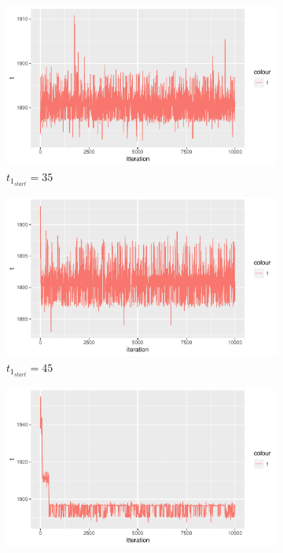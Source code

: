 \begin{figure}[h]
    \centering
    \begin{subfigure}[b]{0.32\textwidth}
        \centering
        \includegraphics[width = \textwidth]{Images/sim_t_start_35.pdf}
        \caption{$t_{1_{start}} = 35$}
        \label{fig:sim_t_diff_start_35}
    \end{subfigure}
    \begin{subfigure}[b]{0.32\textwidth}
        \centering
        \includegraphics[width = \textwidth]{Images/sim_t.pdf}
        \caption{$t_{1_{start}} = 45$}
        \label{fig:sim_t_diff_start_45}
    \end{subfigure}
    \begin{subfigure}[b]{0.32\textwidth}
        \centering
        \includegraphics[width = \textwidth]{Images/sim_t_start_90.pdf}

\end{subfigure}
\end{figure}
